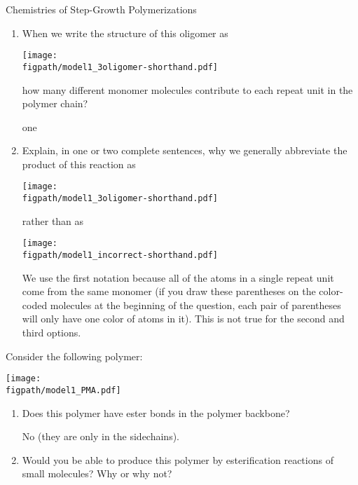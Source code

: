\begin{activity}{Chemistries of Step-Growth Polymerizations}
\begin{ctqs}
\begin{enumerate}
			\item When we write the structure of this oligomer as
	
	\centerline{\texttt{[image: \\figpath/model1\_3oligomer-shorthand.pdf]}}
	\vspace{-3pt}
	how many different monomer molecules contribute to each repeat unit in the polymer chain?
			
				\begin{solution}[1in]
					one
				\end{solution}
		
			\item Explain, in one or two complete sentences, why we generally abbreviate the product of this reaction as
	
	\centerline{\texttt{[image: \\figpath/model1\_3oligomer-shorthand.pdf]}}
	
	rather than as
	
	\centerline{\texttt{[image: \\figpath/model1\_incorrect-shorthand.pdf]}}
			
				\begin{solution}[2in]
					We use the first notation because all of the atoms in a single repeat unit come from the same monomer (if you draw these parentheses on the color-coded molecules at the beginning of the question, each pair of parentheses will only have one color of atoms in it).  This is not true for the second and third options.
				\end{solution}
			
		\end{enumerate}
	
	\question Consider the following polymer:\label{\labelbase:ctq:PMA}
	
	\centerline{\texttt{[image: \\figpath/model1\_PMA.pdf]}}
	
		\begin{enumerate}
				
			\item Does this polymer have ester bonds in the polymer backbone?
			
				\begin{solution}[0.75in]
					No (they are only in the sidechains).
				\end{solution}
		
			\item Would you be able to produce this polymer by esterification reactions of small molecules?  Why or why not?
			

\end{enumerate}
\end{ctqs}
\end{activity}
